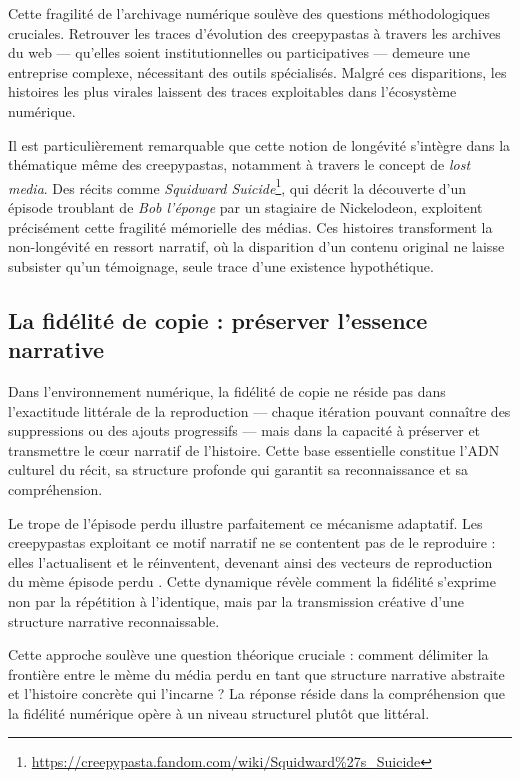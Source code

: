 \documentclass[12pt,a4paper,oneside,titlepage]{book} %
\begin{document}
Cette fragilité de l'archivage numérique soulève des questions méthodologiques cruciales. Retrouver les traces d'évolution des creepypastas à travers les archives du web --- qu'elles soient institutionnelles ou participatives --- demeure une entreprise complexe, nécessitant des outils spécialisés. Malgré ces disparitions, les histoires les plus virales laissent des traces exploitables dans l'écosystème numérique.

Il est particulièrement remarquable que cette notion de longévité s'intègre dans la thématique même des creepypastas, notamment à travers le concept de \textit{lost media}. Des récits comme \textit{Squidward Suicide}\footnote{\url{https://creepypasta.fandom.com/wiki/Squidward\%27s\_Suicide}}, qui décrit la découverte d'un épisode troublant de \textit{Bob l'éponge} par un stagiaire de Nickelodeon, exploitent précisément cette fragilité mémorielle des médias. Ces histoires transforment la non-longévité en ressort narratif, où la disparition d'un contenu original ne laisse subsister qu'un témoignage, seule trace d'une existence hypothétique.

\subsection{La fidélité de copie : préserver l'essence narrative}
\label{meme_fidelité}
Dans l'environnement numérique, la fidélité de copie ne réside pas dans l'exactitude littérale de la reproduction --- chaque itération pouvant connaître des suppressions ou des ajouts progressifs --- mais dans la capacité à préserver et transmettre le cœur narratif de l'histoire. Cette \og base essentielle \fg{} constitue l'ADN culturel du récit, sa structure profonde qui garantit sa reconnaissance et sa compréhension.

Le trope de l'épisode perdu illustre parfaitement ce mécanisme adaptatif. Les creepypastas exploitant ce motif narratif ne se contentent pas de le reproduire : elles l'actualisent et le réinventent, devenant ainsi des vecteurs de reproduction du mème \og épisode perdu \fg{}. Cette dynamique révèle comment la fidélité s'exprime non par la répétition à l'identique, mais par la transmission créative d'une structure narrative reconnaissable.

Cette approche soulève une question théorique cruciale : comment délimiter la frontière entre le mème du \og média perdu \fg{} en tant que structure narrative abstraite et l'histoire concrète qui l'incarne ? La réponse réside dans la compréhension que la fidélité numérique opère à un niveau structurel plutôt que littéral.
\end{document}
